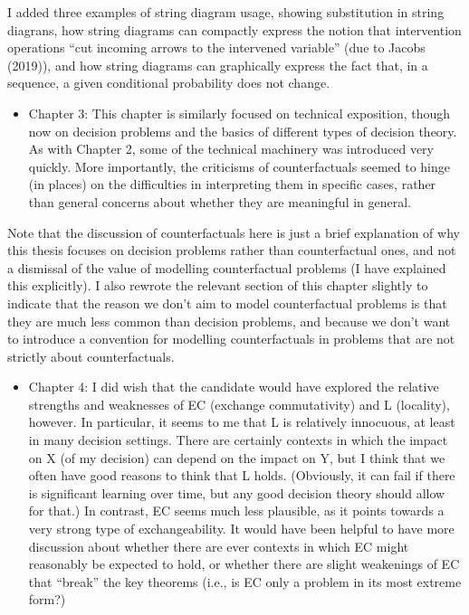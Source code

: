 \documentclass[12pt, a4paper]{article}
\begin{document}
I added three examples of string diagram usage, showing substitution in string diagrans, how string diagrams can compactly express the notion that intervention operations ``cut incoming arrows to the intervened variable'' (due to Jacobs (2019)), and how string diagrams can graphically express the fact that, in a sequence, a given conditional probability does not change.

\begin{itemize}
    \item Chapter 3: This chapter is similarly focused on technical exposition, though now on decision problems and the basics of different types of decision theory. As with Chapter 2, some of the technical machinery was introduced very quickly. More importantly, the criticisms of counterfactuals seemed to hinge (in places) on the difficulties in interpreting them in specific cases, rather than general concerns about whether they are meaningful in general.
\end{itemize}

Note that the discussion of counterfactuals here is just a brief explanation of why this thesis focuses on decision problems rather than counterfactual ones, and not a dismissal of the value of modelling counterfactual problems (I have explained this explicitly). I also rewrote the relevant section of this chapter slightly to indicate that the reason we don't aim to model counterfactual problems is that they are much less common than decision problems, and because we don't want to introduce a convention for modelling counterfactuals in problems that are not strictly about counterfactuals.

\begin{itemize}
    \item Chapter 4: I did wish that the candidate would have explored the relative strengths and weaknesses of EC (exchange commutativity) and L (locality), however. In particular, it seems to me that L is relatively innocuous, at least in many decision settings. There are certainly contexts in which the impact on X (of my decision) can depend on the impact on Y, but I think that we often have good reasons to think that L holds. (Obviously, it can fail if there is significant learning over time, but any good decision theory should allow for that.) In contrast, EC seems much less plausible, as it points towards a very strong type of exchangeability. It would have been helpful to have more discussion about whether there are ever contexts in which EC might reasonably be expected to hold, or whether there are slight weakenings of EC that “break” the key theorems (i.e., is EC only a problem in its most extreme form?)
\end{itemize}
\end{document}
